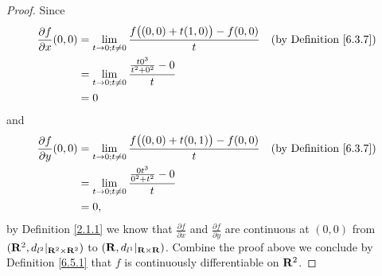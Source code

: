\begin{proof}
    Since
    \begin{align*}
        \frac{\partial f}{\partial x}(0, 0) & = \lim_{t \to 0 ; t \neq 0} \frac{f\big((0, 0) + t(1, 0)\big) - f(0, 0)}{t} & \text{(by Definition \ref{6.3.7})} \\
                                            & = \lim_{t \to 0 ; t \neq 0} \frac{\frac{t 0^3}{t^2 + 0^2} - 0}{t}                                                \\
                                            & = 0
    \end{align*}
    and
    \begin{align*}
        \frac{\partial f}{\partial y}(0, 0) & = \lim_{t \to 0 ; t \neq 0} \frac{f\big((0, 0) + t(0, 1)\big) - f(0, 0)}{t} & \text{(by Definition \ref{6.3.7})} \\
                                            & = \lim_{t \to 0 ; t \neq 0} \frac{\frac{0 t^3}{0^2 + t^2} - 0}{t}                                                \\
                                            & = 0,
    \end{align*}
    by Definition \ref{2.1.1} we know that \(\frac{\partial f}{\partial x}\) and \(\frac{\partial f}{\partial y}\) are continuous at \((0, 0)\) from \((\mathbf{R}^2, d_{l^2}|_{\mathbf{R}^2 \times \mathbf{R}^2})\) to \((\mathbf{R}, d_{l^1}|_{\mathbf{R} \times \mathbf{R}})\).
    Combine the proof above we conclude by Definition \ref{6.5.1} that \(f\) is continuously differentiable on \(\mathbf{R}^2\).


\end{proof}
